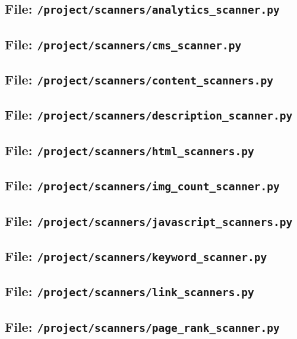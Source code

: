 \subsection{File: \texttt{/project/scanners/analytics\_scanner.py}}
\subsection{File: \texttt{/project/scanners/cms\_scanner.py}}
\subsection{File: \texttt{/project/scanners/content\_scanners.py}}
\subsection{File: \texttt{/project/scanners/description\_scanner.py}}
\subsection{File: \texttt{/project/scanners/html\_scanners.py}}
\subsection{File: \texttt{/project/scanners/img\_count\_scanner.py}}
\subsection{File: \texttt{/project/scanners/javascript\_scanners.py}}
\subsection{File: \texttt{/project/scanners/keyword\_scanner.py}}
\subsection{File: \texttt{/project/scanners/link\_scanners.py}}
\subsection{File: \texttt{/project/scanners/page\_rank\_scanner.py}}
